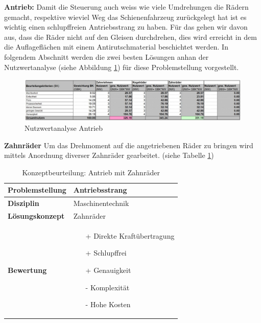 \documentclass[../../../main.tex]{subfiles}
\begin{document}
\textbf{Antrieb:}
Damit die Steuerung auch weiss wie viele Umdrehungen die Rädern gemacht, respektive wieviel Weg das Schienenfahrzeug zurückgelegt hat ist es wichtig einen schlupffreien Antriebsstrang zu haben. Für das gehen wir davon aus, dass die Räder nicht auf den Gleisen durchdrehen, dies wird erreicht in dem die Auflageflächen mit einem Antirutschmaterial beschichtet werden. In folgendem Abschnitt werden die zwei besten Lösungen anhan der Nutzwertanalyse (siehe Abbildung \ref{fig:antrieb}) für diese Problemstellung vorgestellt.

\begin{figure}[H] %
    \centering
    \includegraphics[width=1\textwidth]{Antriebsstrang}
    \caption{Nutzwertanalyse Antrieb}
    \label{fig:antrieb}
\end{figure}

\textbf{Zahnräder}
Um das Drehmoment auf die angetriebenen Räder zu bringen wird mittels Anordnung diverser Zahnräder gearbeitet. (siehe Tabelle \ref{tab:konzept_fahrwerk_zahnraeder})

\begin{flushleft}
    \begin{table}[h]
    \begin{tabular}{ | l | p{11cm} |}
    \hline
    \textbf{Problemstellung} & Antriebsstrang \\ \hline
    \textbf{Disziplin} & Maschinentechnik \\ \hline
    \textbf{Lösungskonzept} & Zahnräder \\ \hline
    \textbf{Bewertung} &  \begin{itemize}
                            \item[+] Direkte Kraftübertragung
                            \item[+] Schlupffrei
                            \item[+] Genauigkeit
                            \item[-] Komplexität
                            \item[-] Hohe Kosten
                          \end{itemize} \\ \hline
    \end{tabular}
    \caption{Konzeptbeurteilung: Antrieb mit Zahnräder}
    \label{tab:konzept_fahrwerk_zahnraeder}
\end{table}
\end{flushleft}
\end{document}
